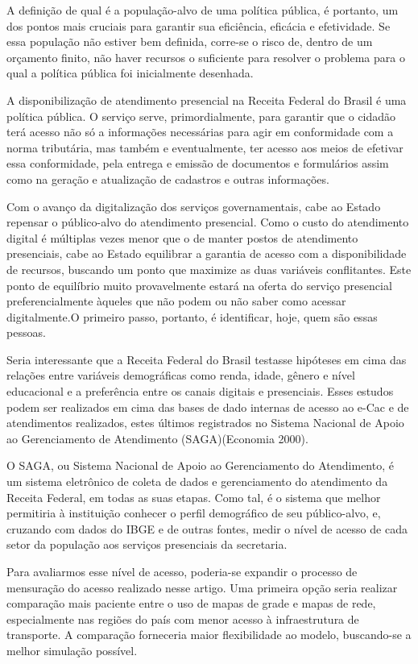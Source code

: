 \documentclass[]{article}
\begin{document}
A definição de qual é a população-alvo de uma política pública, é
portanto, um dos pontos mais cruciais para garantir sua eficiência,
eficácia e efetividade. Se essa população não estiver bem definida,
corre-se o risco de, dentro de um orçamento finito, não haver recursos o
suficiente para resolver o problema para o qual a política pública foi
inicialmente desenhada.

A disponibilização de atendimento presencial na Receita Federal do
Brasil é uma política pública. O serviço serve, primordialmente, para
garantir que o cidadão terá acesso não só a informações necessárias para
agir em conformidade com a norma tributária, mas também e eventualmente,
ter acesso aos meios de efetivar essa conformidade, pela entrega e
emissão de documentos e formulários assim como na geração e atualização
de cadastros e outras informações.

Com o avanço da digitalização dos serviços governamentais, cabe ao
Estado repensar o público-alvo do atendimento presencial. Como o custo
do atendimento digital é múltiplas vezes menor que o de manter postos de
atendimento presenciais, cabe ao Estado equilibrar a garantia de acesso
com a disponibilidade de recursos, buscando um ponto que maximize as
duas variáveis conflitantes. Este ponto de equilíbrio muito
provavelmente estará na oferta do serviço presencial preferencialmente
àqueles que não podem ou não saber como acessar digitalmente.O primeiro
passo, portanto, é identificar, hoje, quem são essas pessoas.

Seria interessante que a Receita Federal do Brasil testasse hipóteses em
cima das relações entre variáveis demográficas como renda, idade, gênero
e nível educacional e a preferência entre os canais digitais e
presenciais. Esses estudos podem ser realizados em cima das bases de
dado internas de acesso ao e-Cac e de atendimentos realizados, estes
últimos registrados no Sistema Nacional de Apoio ao Gerenciamento de
Atendimento (SAGA)(Economia 2000).

O SAGA, ou Sistema Nacional de Apoio ao Gerenciamento do Atendimento, é
um sistema eletrônico de coleta de dados e gerenciamento do atendimento
da Receita Federal, em todas as suas etapas. Como tal, é o sistema que
melhor permitiria à instituição conhecer o perfil demográfico de seu
público-alvo, e, cruzando com dados do IBGE e de outras fontes, medir o
nível de acesso de cada setor da população aos serviços presenciais da
secretaria.

Para avaliarmos esse nível de acesso, poderia-se expandir o processo de
mensuração do acesso realizado nesse artigo. Uma primeira opção seria
realizar comparação mais paciente entre o uso de mapas de grade e mapas
de rede, especialmente nas regiões do país com menor acesso à
infraestrutura de transporte. A comparação forneceria maior
flexibilidade ao modelo, buscando-se a melhor simulação possível.
\end{document}
